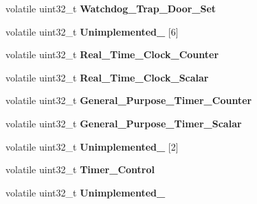 \begin{DoxyCompactItemize}
\item 
\mbox{\label{structERC32__Register__Map_a0dbd611ded33d510657b253279ac530a}} 
volatile uint32\+\_\+t {\bfseries Watchdog\+\_\+\+Trap\+\_\+\+Door\+\_\+\+Set}
\item 
\mbox{\label{structERC32__Register__Map_a03b4abb793931a2fc7806eb388edefc0}} 
volatile uint32\+\_\+t {\bfseries Unimplemented\+\_} \mbox{[}6\mbox{]}
\item 
\mbox{\label{structERC32__Register__Map_a8c892098b13adbb4fcb86bfe2cad20e2}} 
volatile uint32\+\_\+t {\bfseries Real\+\_\+\+Time\+\_\+\+Clock\+\_\+\+Counter}
\item 
\mbox{\label{structERC32__Register__Map_ab1924389f94aa20c3aa817084ae35787}} 
volatile uint32\+\_\+t {\bfseries Real\+\_\+\+Time\+\_\+\+Clock\+\_\+\+Scalar}
\item 
\mbox{\label{structERC32__Register__Map_a9101d7f7a33fcddd5f2092e43147463a}} 
volatile uint32\+\_\+t {\bfseries General\+\_\+\+Purpose\+\_\+\+Timer\+\_\+\+Counter}
\item 
\mbox{\label{structERC32__Register__Map_a83216b458c05f63c903e273e1d82f167}} 
volatile uint32\+\_\+t {\bfseries General\+\_\+\+Purpose\+\_\+\+Timer\+\_\+\+Scalar}
\item 
\mbox{\label{structERC32__Register__Map_ad5f8d4953e24f07306ca7c1948cfaed6}} 
volatile uint32\+\_\+t {\bfseries Unimplemented\+\_} \mbox{[}2\mbox{]}
\item 
\mbox{\label{structERC32__Register__Map_ae3b7c7237dbb9ee8e6e56e39edf94e7b}} 
volatile uint32\+\_\+t {\bfseries Timer\+\_\+\+Control}
\item 
\mbox{\label{structERC32__Register__Map_add57a0e28def28fb6417e211d968c4e2}} 
volatile uint32\+\_\+t {\bfseries Unimplemented\+\_}
\item 
\mbox{\label{structERC32__Register__Map_a2c8f940293e8ab52c738ed933d9bfe56}} 

\end{DoxyCompactItemize}
